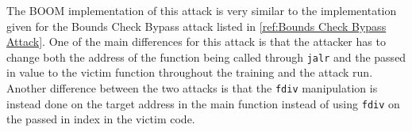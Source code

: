 The BOOM implementation of this attack is very similar to the implementation given for
the Bounds Check Bypass attack listed in \ref{ref:Bounds Check Bypass Attack}. One of the main differences
for this attack is that the attacker has to change both the address of the function being called through
{\tt jalr} and the passed in value to the victim function throughout the training and the attack run.
Another difference between the two attacks is that the {\tt fdiv} manipulation is instead done on the target address
in the main function instead of using {\tt fdiv} on the passed in index in the victim code.
